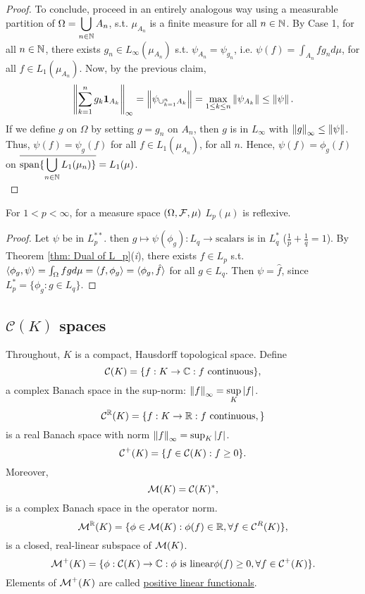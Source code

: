\documentclass{article}
\begin{document}
\begin{proof}
    To conclude, proceed in an entirely analogous way using a measurable partition of $\Omega = \displaystyle\bigcup_{n\in\mathbb{N}}A_n$, s.t. $\mu_{A_n}$ is a finite measure for all $n\in\mathbb{N}$. By Case 1, for all $n\in\mathbb{N}$, there exists $g_n\in L_\infty (\mu_{A_n})$ s.t. $\psi_{A_n}=\psi_{g_n}$, i.e. $\psi(f)=\int_{A_n} f g_n d\mu$, for all $f\in L_1(\mu_{A_n})$. Now, by the previous claim, 
    $$
\displaystyle\left\lVert\sum^n_{k=1}g_k\mathbf{1}_{A_k}\right\rVert_\infty = \left\lVert\psi_{\cup_{k=1}^nA_k}\right\rVert = \displaystyle\max_{1\leq k\leq n}\left\lVert\psi_{A_k}\right\rVert\leq \left\lVert\psi\right\rVert.
$$ 
If we define $g$ on $\Omega$ by setting $g=g_n$ on $A_n$, then $g$ is in $L_\infty$ with $\left\lVert g\right\rVert_\infty\leq \left\lVert\psi\right\rVert$. Thus, $\psi(f)=\psi_g(f)$ for all $f\in L_1(\mu_{A_n})$, for all $n$. Hence, $\psi(f)=\phi_g(f)$ on $\overline{\operatorname{span}\{\displaystyle\bigcup_{n\in\mathbb{N}}L_1(\mu_n)\}}=L_1(\mu)$.\\
\end{proof}

\begin{boxcor}\label{cor: reflexivity of L_p}
    For $1<p<\infty$, for a measure space $(\Omega, \mathcal{F}, \mu)$ $L_p(\mu)$ is reflexive. 
\end{boxcor}

\begin{proof}
    Let $\psi$ be in $L_p^{**}$. then $g\mapsto \psi(\phi_g):L_q\to \text{scalars}$ is in $L_q^*$ ($\frac{1}{p}+\frac{1}{q}=1$). By Theorem \ref{thm: Dual of L_p}(\textit{i}), there exists $f\in L_p$ s.t. $\langle \phi_g, \psi\rangle=\int_\Omega fgd\mu = \langle f, \phi_g\rangle=\langle \phi_g, \hat{f}\rangle$ for all $g\in L_q$. Then $\psi = \hat{f}$, since $L_p^* = \{\phi_g: g\in L_q\}$. 
\end{proof}

\subsection{$\mathcal{C}(K)$ spaces}

Throughout, $K$ is a compact, Hausdorff topological space. Define \\
$$
\mathcal{C}(K)=\{f:K\to\mathbb{C}: f \text{ continuous}\},
$$
a complex Banach space in the sup-norm: $\left\lVert f\right\rVert_\infty=\displaystyle\sup_{K}|f|$.\\
$$
\operatorname{\mathcal{C}}^{\mathbb{R}}(K)=\{f:K\to\mathbb{R}: f \text{ continuous},\}
$$
is a real Banach space with norm $\left\lVert f\right\rVert_\infty=\sup_K|f|$. 
$$
\operatorname{\mathcal{C}}^+(K)=\{f\in\operatorname{\mathcal{C}}(K): f \geq 0\}.
$$
Moreover, 
$$
\operatorname{\mathcal{M}}(K)=\operatorname{\mathcal{C}}(K)^*,
$$
is a complex Banach space in the operator norm.\\
$$
\operatorname{\mathcal{M}}^{\mathbb{R}}(K)=\{\phi\in\operatorname{\mathcal{M}}(K):\phi(f)\in\mathbb{R}, \forall f\in\operatorname{\mathcal{C}}^{R}(K)\},
$$
is a closed, real-linear subspace of $\operatorname{\mathcal{M}}(K)$.\\
$$
\operatorname{\mathcal{M}}^{+}(K)=\{\phi:\operatorname{\mathcal{C}}(K)\to\mathbb{C}:\phi \text{ is linear} \phi(f)\geq 0, \forall f\in\operatorname{\mathcal{C}}^{+}(K)\}.
$$
Elements of $\operatorname{\mathcal{M}}^+(K)$ are called \noindent\underline{positive linear functionals}. \\
\end{document}
